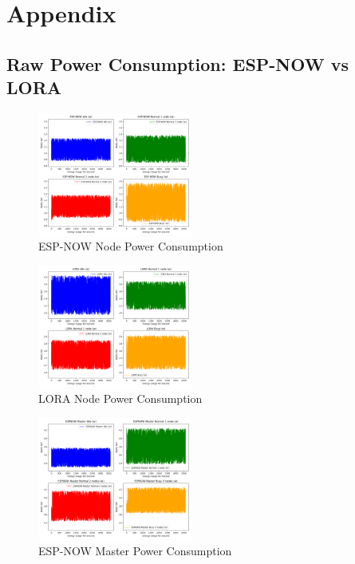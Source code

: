 \section{Appendix}\label{sec:appendix}

\subsection{Raw Power Consumption: ESP-NOW vs LORA}\label{sec:raw_power_consumption}
\begin{figure}[H]
  \begin{center}
    \includegraphics[width=0.45\textwidth]{./Figures/Power_Consumption/ESP-NOW.png}
  \end{center}
  \caption{ESP-NOW Node Power Consumption}\label{fig:espnow_node_power_consumption}
\end{figure}

\begin{figure}[H]
  \begin{center}
    \includegraphics[width=0.45\textwidth]{./Figures/Power_Consumption/LORA.png}
  \end{center}
  \caption{LORA Node Power Consumption}\label{fig:lora_node_power_consumption}
\end{figure}

\begin{figure}[H]
  \begin{center}
    \includegraphics[width=0.45\textwidth]{./Figures/Power_Consumption/ESP-NOW_MASTER.png}
  \end{center}
  \caption{ESP-NOW Master Power Consumption}\label{fig:espnowmaster_power_consumption}
\end{figure}

